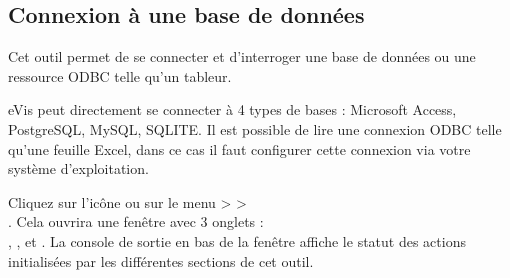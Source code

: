 \subsection{Connexion à une base de données}\label{evis_database}


Cet outil permet de se connecter et d'interroger une base de données ou une ressource ODBC telle qu'un tableur.


eVis peut directement se connecter à 4 types de bases : Microsoft Access, PostgreSQL, MySQL, SQLITE. Il est possible de lire une connexion ODBC telle qu'une feuille Excel, dans ce cas il faut configurer cette connexion via votre système d'exploitation.

\label{evis_launch_database}


Cliquez sur l'icône  ou sur le menu  >  >\\ . Cela ouvrira une fenêtre avec 3 onglets :\\ , , et . La console de sortie en bas de la fenêtre affiche le statut des actions initialisées par les différentes sections de cet outil.

